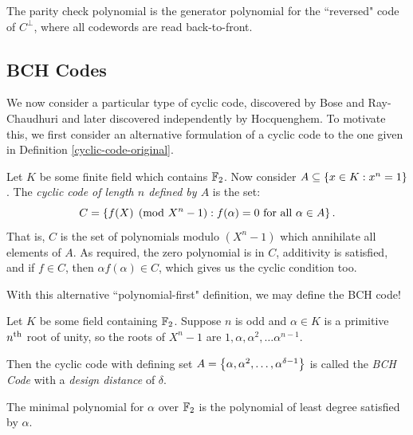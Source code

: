 \documentclass{article}
\begin{document}
\begin{corollary}
    The parity check polynomial is the generator polynomial for the ``reversed" code of $C^\bot$, where all codewords are read back-to-front.
\end{corollary}


\subsection{BCH Codes}
\label{section-algebraic-bch-codes}

We now consider a particular type of cyclic code, discovered by Bose and Ray-Chaudhuri and later discovered independently by Hocquenghem. To motivate this, we first consider an alternative formulation of a cyclic code to the one given in Definition \ref{cyclic-code-original}.

\begin{definition}
    Let $K$ be some finite field which contains $\mathbb{F}_2$. Now consider $A \subseteq \left\lbrace x \in K : x^n = 1 \right\rbrace$. The \textit{cyclic code of length $n$ defined by $A$} is the set:
    \[
	C = \left\lbrace f(X) \pmod{X^n-1} : f(\alpha) = 0 \text{ for all } \alpha \in A \right\rbrace.
	\]
	That is, $C$ is the set of polynomials modulo $(X^n-1)$ which annihilate all elements of $A$. As required, the zero polynomial is in $C$, additivity is satisfied, and if $f \in C$, then $\alpha f(\alpha) \in C$, which gives us the cyclic condition too.
\end{definition}

With this alternative ``polynomial-first" definition, we may define the BCH code!

\begin{definition}
    Let $K$ be some field containing $\mathbb{F}_2$. Suppose $n$ is odd and $\alpha \in K$ is a primitive $n^{\text{th}}$ root of unity, so the roots of $X^n-1$ are $1, \alpha, \alpha^2, \dots \alpha^{n-1}$.
    
    Then the cyclic code with defining set $A = \left\lbrace \alpha, \alpha^2, \dots, \alpha^{\delta-1} \right\rbrace$ is called the \textit{BCH Code} with a \textit{design distance} of $\delta$.
\end{definition}

\begin{note}
    The minimal polynomial for $\alpha$ over $\mathbb{F}_2$ is the polynomial of least degree satisfied by $\alpha$.
\end{note}
\end{document}
